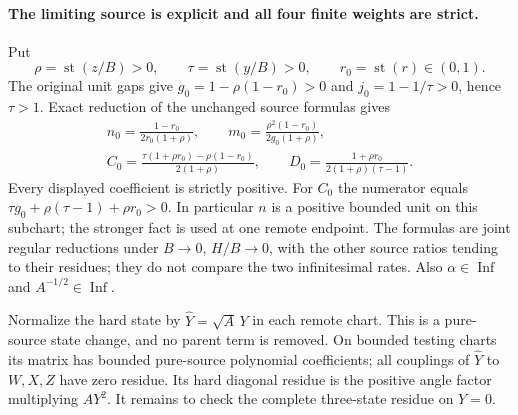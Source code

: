 \paragraph{The limiting source is explicit and all four finite weights are strict.}
Put
\[
 \rho=\operatorname{st}(z/B)>0,\qquad
 \tau=\operatorname{st}(y/B)>0,\qquad
 r_0=\operatorname{st}(r)\in(0,1).
\]
The original unit gaps give
$g_0=1-\rho(1-r_0)>0$ and
$j_0=1-1/\tau>0$, hence $\tau>1$.
Exact reduction of the unchanged source formulas gives
\[
 \begin{gathered}
 n_0=\frac{1-r_0}{2r_0(1+\rho)},\qquad
 m_0=\frac{\rho^2(1-r_0)}{2g_0(1+\rho)},\\
 C_0=\frac{\tau(1+\rho r_0)-\rho(1-r_0)}{2(1+\rho)},\qquad
 D_0=\frac{1+\rho r_0}{2(1+\rho)(\tau-1)}.             
 \end{gathered}
\tag{WR1}
\]
Every displayed coefficient is strictly positive. For $C_0$ the
numerator equals $\tau g_0+\rho(\tau-1)+\rho r_0>0$.
In particular $n$ is a positive bounded unit on this subchart;
the stronger fact is used at one remote endpoint. The formulas
are joint regular reductions under $B\to0$, $H/B\to0$, with
the other source ratios tending to their residues; they do not
compare the two infinitesimal rates. Also
$\alpha\in\operatorname{Inf}$ and $A^{-1/2}\in\operatorname{Inf}$.

Normalize the hard state by $\widehat Y=\sqrt A\,Y$ in each
remote chart. This is a pure-source state change, and no parent
term is removed. On bounded testing charts its matrix has bounded
pure-source polynomial coefficients; all couplings of
$\widehat Y$ to $W,X,Z$ have zero residue. Its hard diagonal
residue is the positive angle factor multiplying $AY^2$.
It remains to check the complete three-state residue on $Y=0$.

